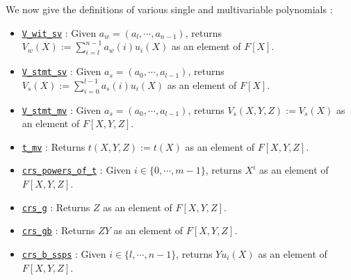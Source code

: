 \documentclass{article}
\theoremstyle{definition}
\theoremstyle{remark}
\begin{document}
We now give the definitions of various single and multivariable polynomials :
\begin{itemize}
  \item \href{https://github.com/BoltonBailey/formal-snarks-project/blob/7fd9cd122f5887f88f6a706b4f2a68a7153c7381/src/snarks/babysnark/knowledge_soundness.lean#L120}{\texttt{V\_wit\_sv}} : Given $a_w = (a_l, \cdots, a_{n - 1})$, returns $V_w(X) := \sum_{i = l}^{n - 1} a_w (i) u_i (X)$ as an element of $F[X]$.
  \item \href{https://github.com/BoltonBailey/formal-snarks-project/blob/7fd9cd122f5887f88f6a706b4f2a68a7153c7381/src/snarks/babysnark/knowledge_soundness.lean#L124}{\texttt{V\_stmt\_sv}} : Given $a_s = (a_0, \cdots, a_{l - 1})$, returns $V_s(X) := \sum_{i = 0}^{l - 1} a_s (i) u_i (X)$ as an element of $F[X]$.
  \item \href{https://github.com/BoltonBailey/formal-snarks-project/blob/7fd9cd122f5887f88f6a706b4f2a68a7153c7381/src/snarks/babysnark/knowledge_soundness.lean#L153}{\texttt{V\_stmt\_mv}} : Given $a_s = (a_0, \cdots, a_{l - 1})$, returns $V_s(X, Y, Z) := V_s(X)$ as an element of $F[X, Y, Z]$.
  \item \href{https://github.com/BoltonBailey/formal-snarks-project/blob/7fd9cd122f5887f88f6a706b4f2a68a7153c7381/src/snarks/babysnark/knowledge_soundness.lean#L150}{\texttt{t\_mv}} : Returns $t(X, Y, Z) := t(X)$ as an element of $F[X, Y, Z]$.
  \item \href{https://github.com/BoltonBailey/formal-snarks-project/blob/7fd9cd122f5887f88f6a706b4f2a68a7153c7381/src/snarks/babysnark/knowledge_soundness.lean#L166}{\texttt{crs\_powers\_of\_t}} : Given $i \in \{ 0, \cdots, m - 1 \}$, returns $X^i$ as an element of $F[X, Y, Z]$.
  \item \href{https://github.com/BoltonBailey/formal-snarks-project/blob/7fd9cd122f5887f88f6a706b4f2a68a7153c7381/src/snarks/babysnark/knowledge_soundness.lean#L167}{\texttt{crs\_g}} : Returns $Z$ as an element of $F[X, Y, Z]$.
  \item \href{https://github.com/BoltonBailey/formal-snarks-project/blob/7fd9cd122f5887f88f6a706b4f2a68a7153c7381/src/snarks/babysnark/knowledge_soundness.lean#L168}{\texttt{crs\_gb}} : Returns $Z Y$ as an element of $F[X, Y, Z]$.
  \item \href{https://github.com/BoltonBailey/formal-snarks-project/blob/7fd9cd122f5887f88f6a706b4f2a68a7153c7381/src/snarks/babysnark/knowledge_soundness.lean#L169}{\texttt{crs\_b\_ssps}} : Given $i \in \{ l, \cdots, n - 1 \}$, returns $Y u_i(X)$ as an element of $F[X, Y, Z]$.
\end{itemize}
\end{document}
